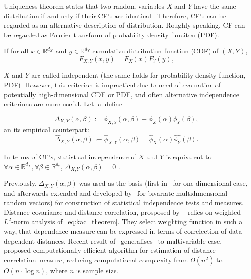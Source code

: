 \documentclass{article}
\begin{document}
Uniqueness theorem states that two random variables $X$ and $Y$ have the same distribution if and only if their CF's are identical \cite{?}. Therefore, CF's can be regarded as an alternative description of distribution. Roughly speaking, CF can be regarded as Fourier transform of probability density funciton (PDF).

If for all $x \in \mathbb{R}^{d_{X}}$ and $y \in \mathbb{R}^{d_{Y}}$ cumulative distribution function (CDF) of $(X,Y)$, 
\begin{equation}
\label{eq:independence}
F_{X,Y}(x,y) = F_{X}(x)F_{Y}(y),
\end{equation} 

$X$ and $Y$ are called independent (the same holds for probability density function, PDF). However, this criterion is impractical due to need of evaluation of potentially high-dimensional CDF or PDF, and often alternative independence criterions are more useful. Let us define 

\begin{equation}
\label{eq:kac_theorem}
\Delta_{X,Y}(\alpha, \beta) := \phi_{X,Y}(\alpha,\beta) - \phi_{X}(\alpha) \phi_{Y}(\beta),
\end{equation}
an its empirical counterpart:
\begin{equation}
\label{eq:empirical_delta}
\widehat{\Delta}_{X,Y}(\alpha, \beta) := \widehat{\phi}_{X,Y}(\alpha,\beta) - \widehat{\phi}_{X}(\alpha) \widehat{\phi_{Y}}(\beta).
\end{equation}

In terms of CF's, statistical independence  of $X$ and $Y$ is equivalent to $\forall \alpha \in \mathbb{R}^{d_X},\forall \beta \in \mathbb{R}^{d_Y} $, $\Delta_{X,Y}(\alpha, \beta) = 0$~\cite{KacTheorem}.

Previously, $\Delta_{X,Y}(\alpha, \beta)$ was used as the basis (first in~\cite{Feuerverger} for one-dimensional case, and afterwards extended and developed by~\cite{Szekely} for bivariate multidimensional random vectors) for construction of statistical independence tests and measures. Distance covariance and distance correlation, prosposed by ~\cite{Szekely} relies on weighted $L^{2}$-norm analysis of~\eqref{eq:kac_theorem}. They select weighting function in such a way, that dependence measure can be expressed in terms of correlection of data-dependent distances. Recent result of~\cite{Bottcher} generalises~\cite{Szekely} to multivariable case.~\cite{CHAUDHURI201915} proposed computationally efficient algorithm for estimation of distance correlation measure, reducing computational complexity from $O(n^2)$ to $O(n\cdot \log n)$, where $n$ is sample size.
\end{document}
